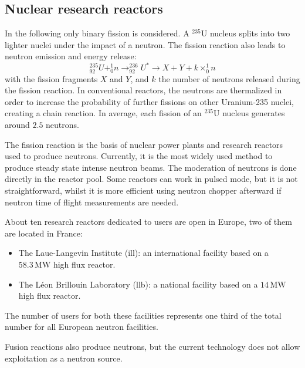 \begin{refsection}
  \subsection{Nuclear research reactors}
  In the following only binary fission is considered.
  A $^{235}$U nucleus splits into two lighter nuclei under the impact of a neutron. The fission reaction also leads to neutron emission and energy release:
  \begin{equation}
    _{92}^{235}U + _{0}^{1}n \rightarrow _{92}^{236}U^* \rightarrow X + Y + k \times _{0}^{1}n
  \end{equation}
  with the fission fragments $X$ and $Y$, and $k$ the number of neutrons released during the fission reaction. In conventional reactors, the neutrons are thermalized in order to increase the probability of further fissions on other Uranium-235 nuclei, creating a chain reaction. In average, each fission of an $^{235}$U nucleus generates around $2.5$ neutrons.

  The fission reaction is the basis of nuclear power plants and research reactors used to produce neutrons.
  Currently, it is the most widely used method to produce steady state intense neutron beams. The moderation of neutrons is done directly in the reactor pool.
  Some reactors can work in pulsed mode, but it is not straightforward, whilst it is more efficient using neutron chopper afterward if neutron time of flight measurements are needed.

  About ten research reactors dedicated to users are open in Europe, two of them are located in France:
  \begin{itemize}
    \item The Laue-Langevin Institute (\acrshort{ill}): an international facility based on a $58.3\,\mathrm{MW}$ high flux reactor.
    \item The Léon Brillouin Laboratory (\acrshort{llb}): a national facility based on a $14\,\mathrm{MW}$ high flux reactor.
  \end{itemize}
  The number of users for both these facilities represents one third of the total number for all European neutron facilities.

  Fusion reactions also produce neutrons, but the current technology does not allow exploitation as a neutron source.


\end{refsection}
